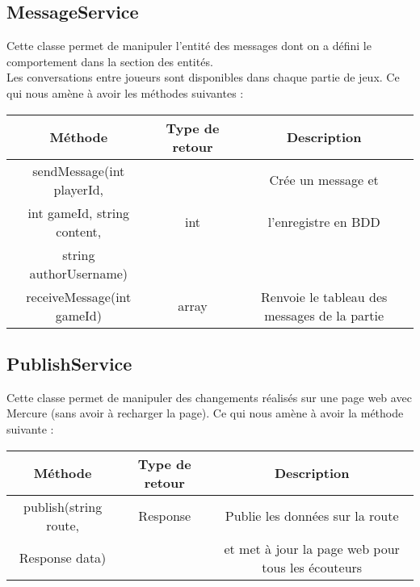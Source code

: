 \documentclass{article}
\begin{document}
        \subsection{MessageService}
            Cette classe permet de manipuler l'entité des messages dont on a défini le comportement dans la section des entités.\\
            \indent Les conversations entre joueurs sont disponibles dans chaque partie de jeux. Ce qui nous amène à avoir les méthodes suivantes :
            \begin{center}
                \begin{tabular}{|| c | c | c ||}
                \hline 
                    Méthode & Type de retour & Description \\
                    \hline
                    \hline
                    sendMessage(int playerId, & & Crée un message et \\
                    int gameId, string content, & int & l'enregistre en BDD \\
                    string authorUsername) & & \\
                    \hline
                    receiveMessage(int gameId) & array & Renvoie le tableau des messages de la partie \\
                    \hline
                \end{tabular}
            \end{center}


         \subsection{PublishService}
            Cette classe permet de manipuler des changements réalisés sur une page web avec Mercure (sans avoir à recharger la page). Ce qui nous amène à avoir la méthode suivante :
            \begin{center}
                \begin{tabular}{|| c | c | c ||}
                \hline 
                    Méthode & Type de retour & Description \\
                    \hline
                    \hline
                    publish(string route, & Response & Publie les données sur la route \\
                    Response data) & & et met à jour la page web pour tous les écouteurs\\
                    \hline
                \end{tabular}
            \end{center}
\end{document}
